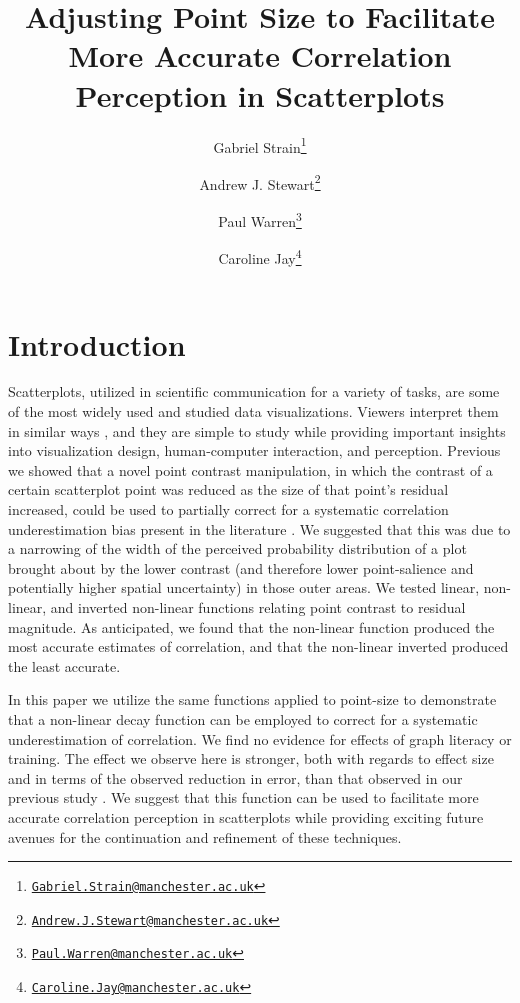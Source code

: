 \documentclass{vgtc}                          %
\title{Adjusting Point Size to Facilitate More Accurate Correlation Perception in Scatterplots}
\author{Gabriel Strain\thanks{\href{mailto:Gabriel.Strain@manchester.ac.uk}{\nolinkurl{Gabriel.Strain@manchester.ac.uk}}} %
\and Andrew J. Stewart\thanks{\href{mailto:Andrew.J.Stewart@manchester.ac.uk}{\nolinkurl{Andrew.J.Stewart@manchester.ac.uk}}} %
\and Paul Warren\thanks{\href{mailto:Paul.Warren@manchester.ac.uk}{\nolinkurl{Paul.Warren@manchester.ac.uk}}} %
\and Caroline Jay\thanks{\href{mailto:Caroline.Jay@manchester.ac.uk}{\nolinkurl{Caroline.Jay@manchester.ac.uk}}}} %
\affiliation{\scriptsize The University of Manchester}
\begin{document}

\firstsection{}

\maketitle

\hypertarget{introduction}{%
\section{Introduction}\label{introduction}}

Scatterplots, utilized in scientific communication for a variety of tasks,
are some of the most widely used and studied data visualizations. Viewers
interpret them in similar ways \cite{kay_heer_2015}, and they are simple
to study while providing important insights into visualization
design, human-computer interaction, and perception. Previous \cite{strain_2023}
we showed that a novel point contrast manipulation, in which the contrast of a certain
scatterplot point was reduced as the size of that point's residual increased, could be
used to partially correct for a systematic correlation underestimation bias present in the
literature \cite{strahan_1978, bobko_1979, cleveland_1982, lane_1985, lauer_1989, 
collyer_1990, meyer_1992}. We suggested that this was due to a narrowing of the width
of the perceived probability distribution of a plot brought
about by the lower contrast (and therefore lower point-salience and potentially higher spatial uncertainty)
in those outer areas. We tested linear, non-linear, and inverted non-linear functions relating point contrast to
residual magnitude. As anticipated, we found that the non-linear function produced
the most accurate estimates of correlation, and that the non-linear inverted produced
the least accurate.

In this paper we utilize the same functions applied to point-size to demonstrate that
a non-linear decay function can be employed to correct for a systematic underestimation of correlation.
We find no evidence for effects of graph literacy or training.
The effect we observe here is stronger, both with regards to effect size
and in terms of the observed reduction in error, than that
observed in our previous study \cite{strain_2023}. We suggest that this
function can be used to facilitate more accurate correlation
perception in scatterplots while providing exciting future avenues for the continuation
and refinement of these techniques.
\end{document}
